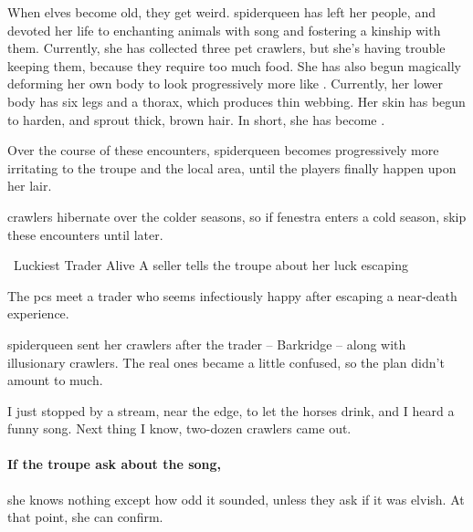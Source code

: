 
\noindent
When elves become old, they get weird.
\Gls{spiderqueen} has left her people, and devoted her life to enchanting animals with song and fostering a kinship with them.
Currently, she has collected three pet \glspl{crawler}, but she's having trouble keeping them, because they require too much food.%
She has also begun magically deforming her own body to look progressively more like .
Currently, her lower body has six legs and a thorax, which produces thin webbing.
Her skin has begun to harden, and sprout thick, brown hair.
In short, she has become .

Over the course of these encounters, \gls{spiderqueen} becomes progressively more irritating to the troupe and the local area, until the players finally happen upon her lair.

\Glspl{crawler} hibernate over the colder seasons, so if \gls{fenestra} enters a cold season, skip these encounters until later.%

{\squash~Luckiest Trader Alive}%
{A seller tells the troupe about her luck escaping }%

The \glspl{pc} meet a trader who seems infectiously happy after escaping a near-death experience.

\begin{exampletext}
  \Gls{spiderqueen} sent her \glspl{crawler} after the trader -- Barkridge -- along with illusionary crawlers.
  The real ones became a little confused, so the plan didn't amount to much.
\end{exampletext}

\begin{boxtext}
  \begin{speechtext}
  I just stopped by a stream, near the \gls{edge}, to let the horses drink, and I heard a funny song.
  Next thing I know, two-dozen crawlers came out.
  \end{speechtext}
\end{boxtext}

\paragraph{If the troupe ask about the song,}
she knows nothing except how odd it sounded, unless they ask if it was elvish.
At that point, she can confirm.

